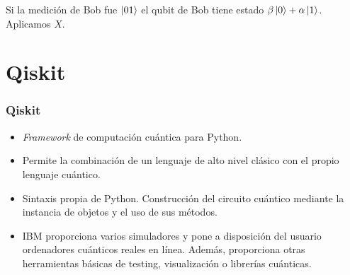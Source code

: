 \documentclass{beamer}
\begin{document}
\begin{frame}
{\begin{center}
Si la medición de Bob fue $\left|01\right\rangle$ el qubit de Bob tiene estado $\beta\left|0\right\rangle+\alpha\left|1\right\rangle$. Aplicamos $X$.
\end{center}
}
\end{frame}

\section{Qiskit}
\begin{frame}
	\frametitle{Qiskit}
	\begin{itemize}
 	\item \textit{Framework} de computación cuántica para Python.
 	\item Permite la combinación de un lenguaje de alto nivel clásico con el propio lenguaje cuántico.
 	\item Sintaxis propia de Python. Construcción del circuito cuántico mediante la instancia de objetos y el uso de sus métodos.
 	\item IBM proporciona varios simuladores y pone a disposición del usuario ordenadores cuánticos reales en línea. Además, proporciona otras herramientas básicas de testing, visualización o librerías cuánticas.
	\end{itemize}
\end{frame}
\end{document}
